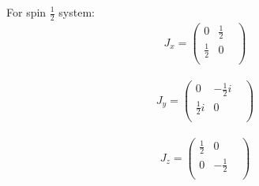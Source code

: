 \documentclass[10pt,a4paper]{article}
\begin{document}
For spin $\frac{1}{2}$ system:\begin{align}
J_x = \begin{pmatrix}
0&\frac{1}{2}&\\\frac{1}{2}&0&\\\end{pmatrix}\end{align}

\begin{align}
J_y = \begin{pmatrix}
0&-\frac{1}{2}i&\\\frac{1}{2}i&0&\\\end{pmatrix}\end{align}

\begin{align}
J_z = \begin{pmatrix}
\frac{1}{2}&0&\\0&-\frac{1}{2}&\\\end{pmatrix}\end{align}
\end{document}
